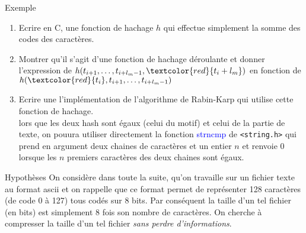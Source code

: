 \documentclass[10pt]{beamer}
\begin{document}
\begin{frame}{\Ctitle}{\stitle}
	\begin{exampleblock}{Exemple}
		\begin{enumerate}
			\item Ecrire en C, une fonction de hachage $h$ qui effectue simplement la somme des codes des caractères.
			\item Montrer qu'il s'agit d'une fonction de hachage déroulante et donner l'expression de $h(t_{i+1},\dots,t_{i+l_m-1},\textcolor{red}{t_i+l_m})$ en fonction de $h(\textcolor{red}{t_i},t_{i+1},\dots,t_{i+l_m-1})$ 
			\item Ecrire une l'implémentation de l'algorithme de Rabin-Karp qui utilise cette fonction de hachage. \\
			\textcolor{OliveGreen}{\small \aide \;} lors que les deux hash sont égaux (celui du motif) et celui de la partie de texte, on pouura utiliser directement la fonction \textcolor{blue}{strncmp} de {\tt <string.h>} qui prend en argument deux chaines de caractères et un entier $n$ et renvoie 0 lorsque les $n$ premiers caractères des deux chaines sont égaux.
		\end{enumerate}
	\end{exampleblock}
\end{frame}

\begin{frame}{\Ctitle}{\stitle}
	\begin{block}{Hypothèses}
		{\small On considère dans toute la suite, qu'on travaille sur un fichier texte au format {\sc ascii} et on rappelle que ce format permet de représenter 128 caractères (de code 0 à 127) tous codés sur 8 bits. Par conséquent la taille d'un tel fichier (en bits) est simplement 8 fois son nombre de caractères.
		On cherche à compresser la taille d'un tel fichier \textit{sans perdre d'informations}.}
	\end{block}
\end{frame}
\end{document}
